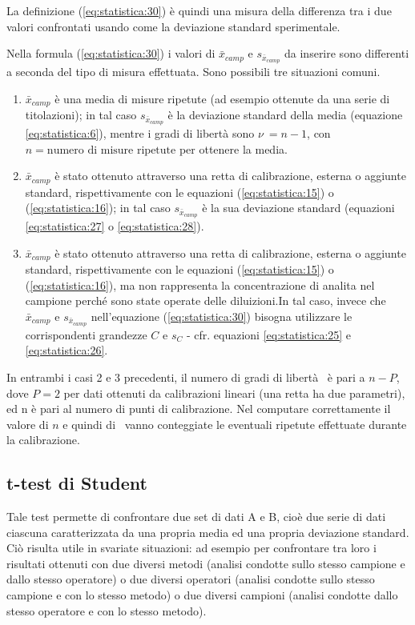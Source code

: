 La definizione (\ref{eq:statistica:30}) è quindi una misura della differenza tra i due valori confrontati usando come  la deviazione standard sperimentale.

Nella formula (\ref{eq:statistica:30}) i valori di $\bar{x}_{camp}$ e $s_{\bar{x}_{camp}}$ da inserire sono differenti a seconda del tipo di misura effettuata. Sono possibili tre situazioni comuni.
\begin{enumerate}
\item $\bar{x}_{camp}$ è una media di misure ripetute (ad esempio ottenute da una serie di titolazioni); in tal caso $s_{\bar{x}_{camp}}$ è la deviazione standard della media (equazione \ref{eq:statistica:6}), mentre i gradi di libertà sono $\nu\ = n - 1$, con $n = \text{numero di misure ripetute}$ per ottenere la media.
\item $\bar{x}_{camp}$ è stato ottenuto attraverso una retta di calibrazione, esterna o aggiunte standard, rispettivamente con le equazioni (\ref{eq:statistica:15}) o (\ref{eq:statistica:16}); in tal caso $s_{\bar{x}_{camp}}$ è la sua deviazione standard (equazioni \ref{eq:statistica:27} o \ref{eq:statistica:28}).
\item $\bar{x}_{camp}$ è stato ottenuto attraverso una retta di calibrazione, esterna o aggiunte standard, rispettivamente con le equazioni (\ref{eq:statistica:15}) o (\ref{eq:statistica:16}), ma non rappresenta la concentrazione di analita nel campione perché sono state operate delle diluizioni.In tal caso, invece che $\bar{x}_{camp}$ e $s_{\bar{x}_{camp}}$ nell'equazione (\ref{eq:statistica:30}) bisogna utilizzare le corrispondenti grandezze $C$ e $s_C$ - cfr. equazioni \ref{eq:statistica:25} e \ref{eq:statistica:26}.
\end{enumerate}

In entrambi i casi 2 e 3 precedenti, il numero di gradi di libertà \nu\ è pari a $n - P$, dove $P = 2$ per dati ottenuti da calibrazioni lineari (una retta ha due parametri), ed n è pari al numero di punti di calibrazione. Nel computare correttamente il valore di $n$ e quindi di \nu\ vanno conteggiate le eventuali ripetute effettuate durante la calibrazione.



\subsection{t-test di Student}

Tale test permette di confrontare due set di dati A e B, cioè due serie di dati ciascuna caratterizzata da una propria media ed una propria deviazione standard. Ciò risulta utile in svariate situazioni: ad esempio per confrontare tra loro i risultati ottenuti con due diversi metodi (analisi condotte sullo stesso campione e dallo stesso operatore) o due diversi operatori (analisi condotte sullo stesso campione e con lo stesso metodo) o due diversi campioni (analisi condotte dallo stesso operatore e con lo stesso metodo).

